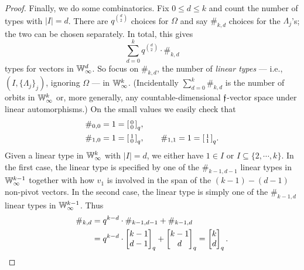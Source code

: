 \begin{proof}
    Finally, we do some combinatorics.
    Fix $0 \leq d \leq k$ and count the number of types with $|I| = d$.
    There are $q^{\binom{d}{2}}$ choices for $\Omega$ and say $\#_{k, d}$ choices for the $\Lambda_j$'s;
    the two can be chosen separately.
    In total, this gives
    \[ 
        \sum_{d=0}^k q^{\binom{d}{2}} \cdot \#_{k, d} 
    \]
    types for vectors in $\mathbb{W}_\infty^d$.
    So focus on $\#_{k, d}$, the number of \emph{linear types} --- i.e., $(I, \{\Lambda_j\}_j)$, ignoring $\Omega$ --- in $\mathbb{W}_\infty^k$.
    (Incidentally $\sum_{d=0}^k \#_{k, d}$ is the number of orbits in $\mathbb{W}_\infty^k$ or, more generally, any countable-dimensional $\mathfrak{f}$-vector space under linear automorphisms.)
    On the small values we easily check that \begin{align*}
        &\#_{0, 0} = 1 = \begin{bsmallmatrix}0 \\ 0\end{bsmallmatrix}_q, \\
        &\#_{1, 0} = 1 = \begin{bsmallmatrix}1 \\ 0\end{bsmallmatrix}_q,\qquad
        \#_{1, 1} = 1 = \begin{bsmallmatrix}1 \\ 1\end{bsmallmatrix}_q.
    \end{align*}
    Given a linear type in $\mathbb{W}_\infty^k$ with $\vert I \vert = d$, 
    we either have $1 \in I$ or $I \subseteq \{2, \cdots, k\}$.
    In the first case, the linear type is specified by one of the $\#_{k-1, d-1}$ linear types in $\mathbb{W}_\infty^{k-1}$
    together with how $v_1$ is involved in the span of the $(k - 1) - (d - 1)$ non-pivot vectors.
    In the second case, the linear type is simply one of the $\#_{k-1, d}$ linear types in $\mathbb{W}_\infty^{k-1}$.
    Thus 
    \begin{align*}
        \#_{k, d} 
        &= q^{k-d} \cdot \#_{k-1, d-1} + \#_{k-1, d} \\
        &= q^{k-d} \cdot \begin{bmatrix}k-1 \\ d-1\end{bmatrix}_q + \begin{bmatrix}k-1 \\ d\end{bmatrix}_q
        = \begin{bmatrix}k \\ d\end{bmatrix}_q.
        \qedhere
    \end{align*}
\end{proof}

